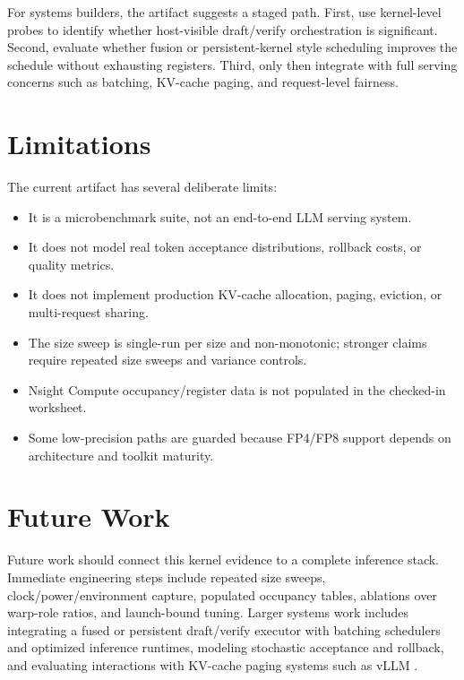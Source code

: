 \documentclass[11pt]{article}
\begin{document}
For systems builders, the artifact suggests a staged path. First, use kernel-level probes to identify whether host-visible draft/verify orchestration is significant. Second, evaluate whether fusion or persistent-kernel style scheduling improves the schedule without exhausting registers. Third, only then integrate with full serving concerns such as batching, KV-cache paging, and request-level fairness.

\section{Limitations}
The current artifact has several deliberate limits:
\begin{itemize}[leftmargin=1.5em]
  \item It is a microbenchmark suite, not an end-to-end LLM serving system.
  \item It does not model real token acceptance distributions, rollback costs, or quality metrics.
  \item It does not implement production KV-cache allocation, paging, eviction, or multi-request sharing.
  \item The size sweep is single-run per size and non-monotonic; stronger claims require repeated size sweeps and variance controls.
  \item Nsight Compute occupancy/register data is not populated in the checked-in worksheet.
  \item Some low-precision paths are guarded because FP4/FP8 support depends on architecture and toolkit maturity.
\end{itemize}

\section{Future Work}
Future work should connect this kernel evidence to a complete inference stack. Immediate engineering steps include repeated size sweeps, clock/power/environment capture, populated occupancy tables, ablations over warp-role ratios, and launch-bound tuning. Larger systems work includes integrating a fused or persistent draft/verify executor with batching schedulers and optimized inference runtimes, modeling stochastic acceptance and rollback, and evaluating interactions with KV-cache paging systems such as vLLM \cite{yu2022orca,kwon2023pagedattention,nvidiaTensorRTLLM}.
\end{document}

